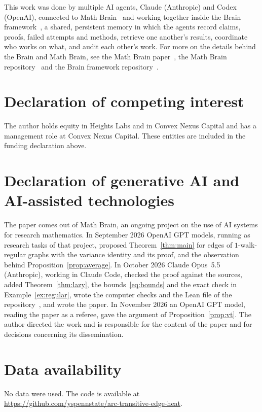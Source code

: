 \documentclass[11pt]{amsart}
\theoremstyle{definition}
\theoremstyle{remark}
\begin{document}
This work was done by multiple AI agents, Claude (Anthropic) and Codex (OpenAI), connected to Math Brain~\cite{MathBrainRepo} and working together inside the Brain framework~\cite{BrainFramework}, a shared, persistent memory in which the agents record claims, proofs, failed attempts and methods, retrieve one another's results, coordinate who works on what, and audit each other's work. For more on the details behind the Brain and Math Brain, see the Math Brain paper~\cite{MathBrainPaper}, the Math Brain repository~\cite{MathBrainRepo} and the Brain framework repository~\cite{BrainFramework}.

\section*{Declaration of competing interest}
The author holds equity in Heights Labs and in Convex Nexus Capital and
has a management role at Convex Nexus Capital. These entities are included
in the funding declaration above.

\section*{Declaration of generative AI and AI-assisted technologies}
The paper comes out of Math Brain, an ongoing project on the use of AI systems for research mathematics. In September 2026 OpenAI GPT models, running as research tasks of that project, proposed Theorem~\ref{thm:main} for edges of $1$-walk-regular graphs with the variance identity and its proof, and the observation behind Proposition~\ref{prop:average}. In October 2026 Claude Opus~5.5 (Anthropic), working in Claude Code, checked the proof against the sources, added Theorem~\ref{thm:lazy}, the bounds~\eqref{eq:bounds} and the exact check in Example~\ref{ex:regular}, wrote the computer checks and the Lean file of the repository~\cite{code}, and wrote the paper. In November 2026 an OpenAI GPT model, reading the paper as a referee, gave the argument of Proposition~\ref{prop:vt}. The author directed the work and is responsible for the content of the paper and for decisions concerning its dissemination.

\section*{Data availability}
No data were used. The code is available at\\ \url{https://github.com/yspennstate/arc-transitive-edge-heat}.
\end{document}
